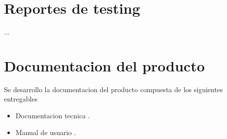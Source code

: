 \section{Reportes de testing}

...


\section{Documentacion del producto }

Se desarrollo la documentacion del producto compuesta de los siguientes entregables
\begin{itemize}
	\item Documentacion tecnica \cite{Robot_Tecnical_doc}.
	\item Manual de usuario \cite{Robot_User_manual}.
\end{itemize}





